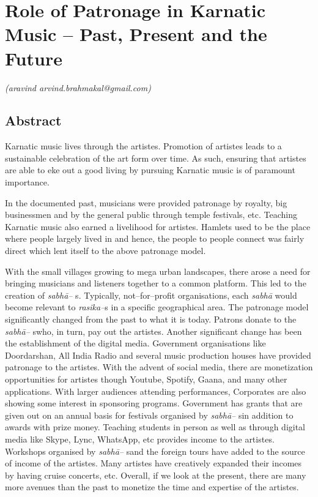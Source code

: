 
\chapter{Role of Patronage in Karnatic Music – Past, Present and the Future}\label{chapter8}


\begin{flushright}
\textit{(aravind arvind.brahmakal@gmail.com)} 
\end{flushright}


\section*{Abstract}

Karnatic music lives through the artistes. Promotion of artistes leads to a sustainable celebration of the art form over time. As such, ensuring that artistes are able to eke out a good living by pursuing Karnatic music is of paramount importance.

In the documented past, musicians were provided patronage by royalty, big businessmen and by the general public through temple festivals, etc. Teaching Karnatic music also earned a livelihood for artistes. Hamlets used to be the place where people largely lived in and hence, the people to people connect was fairly direct which lent itself to the above patronage model.

With the small villages growing to mega urban landscapes, there arose a need for bringing musicians and listeners together to a common platform. This led to the creation of \textit{sabhā–} s. Typically, not–for–profit organisations, each \textit{sabhā} would become relevant to\textit{ rasika–}s in a specific geographical area. The patronage model significantly changed from the past to what it is today. Patrons donate to the \textit{sabhā–} swho, in turn, pay out the artistes. Another significant change has been the establishment of the digital media. Government organisations like Doordarshan, All India Radio and several music production houses have provided patronage to the artistes. With the advent of social media, there are monetization opportunities for artistes though Youtube, Spotify, Gaana, and many other applications. With larger audiences attending performances, Corporates are also showing some interest in sponsoring programs. Government has grants that are given out on an annual basis for festivals organised by \textit{sabhā–} sin addition to awards with prize money. Teaching students in person as well as through digital media like Skype, Lync, WhatsApp, etc provides income to the artistes. Workshops organised by \textit{sabhā–} sand the foreign tours have added to the source of income of the artistes. Many artistes have creatively expanded their incomes by having cruise concerts, etc. Overall, if we look at the present, there are many more avenues than the past to monetize the time and expertise of the artistes.

